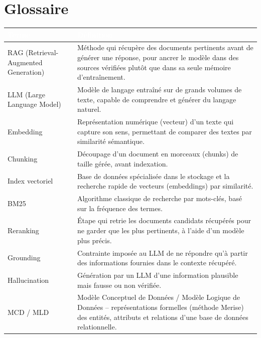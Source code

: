 \documentclass[11pt,a4paper]{article}
\newcommand{\tblhead}[1]{\textcolor{white}{\textbf{#1}}}
\begin{document}
\section{Glossaire}
\begin{longtable}{@{}p{4cm}p{10.2cm}@{}}
\rowcolor{navy}
\tblhead{Terme} & \tblhead{D\'efinition} \\
\midrule
\endhead
RAG (Retrieval-Augmented Generation) & M\'ethode qui r\'ecup\`ere des documents pertinents avant de g\'en\'erer une r\'eponse, pour ancrer le mod\`ele dans des sources v\'erifi\'ees plut\^ot que dans sa seule m\'emoire d'entra\^inement. \\
LLM (Large Language Model) & Mod\`ele de langage entra\^in\'e sur de grands volumes de texte, capable de comprendre et g\'en\'erer du langage naturel. \\
Embedding & Repr\'esentation num\'erique (vecteur) d'un texte qui capture son sens, permettant de comparer des textes par similarit\'e s\'emantique. \\
Chunking & D\'ecoupage d'un document en morceaux (chunks) de taille g\'er\'ee, avant indexation. \\
Index vectoriel & Base de donn\'ees sp\'ecialis\'ee dans le stockage et la recherche rapide de vecteurs (embeddings) par similarit\'e. \\
BM25 & Algorithme classique de recherche par mots-cl\'es, bas\'e sur la fr\'equence des termes. \\
Reranking & \'Etape qui retrie les documents candidats r\'ecup\'er\'es pour ne garder que les plus pertinents, \`a l'aide d'un mod\`ele plus pr\'ecis. \\
Grounding & Contrainte impos\'ee au LLM de ne r\'epondre qu'\`a partir des informations fournies dans le contexte r\'ecup\'er\'e. \\
Hallucination & G\'en\'eration par un LLM d'une information plausible mais fausse ou non v\'erifi\'ee. \\
MCD / MLD & Mod\`ele Conceptuel de Donn\'ees / Mod\`ele Logique de Donn\'ees -- repr\'esentations formelles (m\'ethode Merise) des entit\'es, attributs et relations d'une base de donn\'ees relationnelle. \\
\end{longtable}
\end{document}
